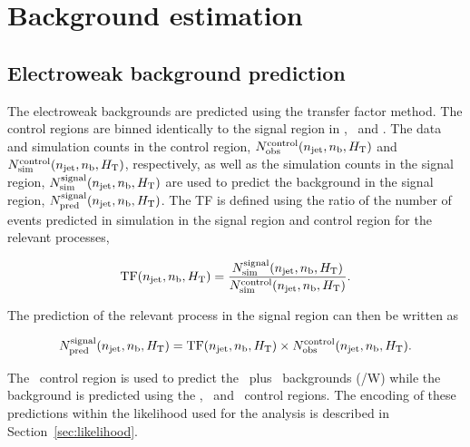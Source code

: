 \section{Background estimation}
\subsection{Electroweak background prediction}
\label{sec:tf-pred}
The electroweak backgrounds are predicted using the transfer factor
method. The control regions are binned identically
to the signal region in \scalht, \nj ~and \nb. The data and simulation counts in the control region,
$N_{\textrm{obs}}^{\rm control}(n_{\text{jet}},n_{\mathrm{b}},\mbox{$H_\text{T}$})$ and $N_{\textrm{sim}}^{\rm control}(n_{\text{jet}},n_{\mathrm{b}},\mbox{$H_\text{T}$})$, respectively, 
as well as the simulation counts in the signal region, $N_{\textrm{sim}}^{\rm signal}(n_{\text{jet}},n_{\mathrm{b}},\mbox{$H_\text{T}$})$ 
are used to predict the background in the signal region, $N_{\textrm{pred}}^{\rm signal}(n_{\text{jet}},n_{\mathrm{b}},\mbox{$H_\text{T}$})$. 
The TF is defined using the ratio of the number of events predicted in 
simulation in the signal region and control region for the relevant processes,

\begin{equation}
  \label{equ:tf-ratio}
  {\rm TF}(n_{\text{jet}},n_{\mathrm{b}},\mbox{$H_\text{T}$}) = \frac{N_{\rm sim}^{\rm signal}(n_{\text{jet}},n_{\mathrm{b}},\mbox{$H_\text{T}$})}{N_{\rm
      sim}^{\rm control}(n_{\text{jet}},n_{\mathrm{b}},\mbox{$H_\text{T}$})}.
\end{equation}

The prediction of the relevant process in the signal region can then be written as

\begin{equation}
  \label{equ:pred-method}
  N_{\textrm{pred}}^{\rm signal}(n_{\text{jet}},n_{\mathrm{b}},\mbox{$H_\text{T}$}) = 
      {\rm TF}(n_{\text{jet}},n_{\mathrm{b}},\mbox{$H_\text{T}$}) \times N_{\textrm{obs}}^{\rm
    control}(n_{\text{jet}},n_{\mathrm{b}},\mbox{$H_\text{T}$}).
\end{equation}

The \mj~control region is used to predict the \wj~plus \ttbar~backgrounds (\ttbar/W) while the
\zj background is predicted using the \mj, \mmj~and \gj~control regions. The encoding
of these predictions within the likelihood used for the \alphat analysis is
described in Section~\ref{sec:likelihood}.
%

